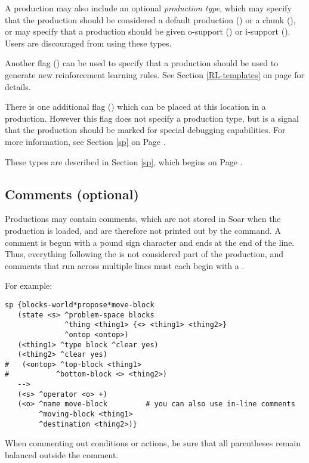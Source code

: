 A production may also include an optional \emph{production type}, which may specify that the production should be considered a default production () or a chunk (), or may specify that a production should be given o-support () or i-support ().  Users are discouraged from using these types.

Another flag () can be used to specify that a production should be used to generate new reinforcement learning rules. See Section \ref{RL-templates} on page \pageref{RL-templates} for details.

There is one additional flag () which can be placed at this location in a production. However this flag does not specify a production type, but is a signal that the production should be marked for special debugging capabilities. For more information, see Section \ref{sp} on Page \pageref{sp}.

These types are described in Section \ref{sp}, which begins on Page \pageref{sp}.

\subsection{Comments (optional)}

Productions may contain comments, which are not stored in Soar when the production is loaded, and are therefore not printed out by the  command. A comment is begun with a pound sign character \soar{\#} and ends at the end of the line.  Thus, everything following the \soar{\#} is not considered part of the production, and comments that run across multiple lines must each begin with a \soar{\#}.

For example:
\begin{verbatim}
sp {blocks-world*propose*move-block
   (state <s> ^problem-space blocks
              ^thing <thing1> {<> <thing1> <thing2>}
              ^ontop <ontop>)
   (<thing1> ^type block ^clear yes)
   (<thing2> ^clear yes)
#   (<ontop> ^top-block <thing1>
#           ^bottom-block <> <thing2>)
   -->
   (<s> ^operator <o> +)
   (<o> ^name move-block         # you can also use in-line comments
        ^moving-block <thing1>
        ^destination <thing2>)}
\end{verbatim}

When commenting out conditions or actions, be sure that all parentheses remain balanced outside the comment.

